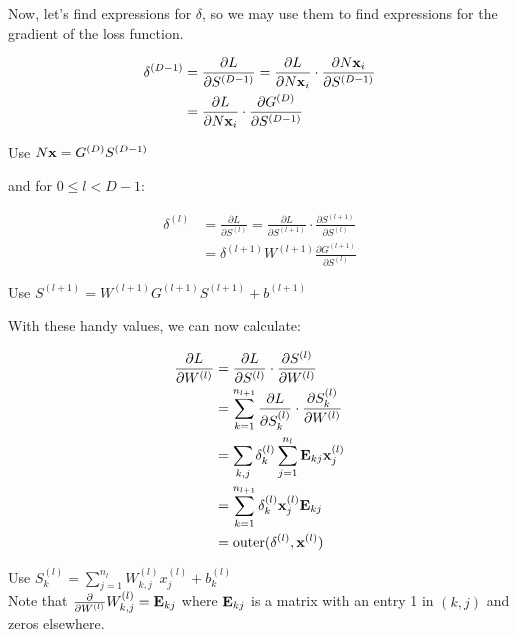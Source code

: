 \medskip
Now, let's find expressions for $\delta$, so we may use them to find expressions for the gradient of the loss function.
\begin{ceqn}
    \begin{align*}
        \delta^{(D-1)}&=\frac{\partial L}{\partial S^{(D-1)}}=\frac{\partial L}{\partial N\vx_{i}}\cdot\frac{\partial N\vx_{i}}{\partial S^{(D-1)}} \\
        &=\frac{\partial L}{\partial N\vx_{i}}\cdot\frac{\partial G^{(D)}}{\partial S^{(D-1)}}
    \end{align*}
\end{ceqn}
\begin{remark}
    Use $N\vx=G^{(D)}S^{(D-1)}$
\end{remark}
\smallskip
and for $0\leq l<D-1$:
\begin{ceqn}
\begin{align*}
    \delta^{(l)}&=\frac{\partial L}{\partial S^{(l)}}=\frac{\partial L}{\partial S^{(l+1)}}\cdot\frac{\partial S^{(l+1)}}{\partial S^{(l)}}\\
&=\delta^{(l+1)}W^{(l+1)}\frac{\partial G^{(l+1)}}{\partial S^{(l)}}
\end{align*}
\end{ceqn}
\begin{remark}
    Use $S^{(l+1)} = W^{(l+1)}G^{(l+1)}S^{(l+1)} + b^{(l+1)}$
\end{remark}
\medskip
With these handy values, we can now calculate:
\begin{ceqn}
\begin{align*}
    \frac{\partial L}{\partial W^{(l)}} &= \frac{\partial L}{\partial S^{(l)}}\cdot\frac{\partial S^{(l)}}{\partial W^{(l)}} \\
    &= \sum_{k=1}^{n_{l+1}}{\frac{\partial L}{\partial S_{k}^{(l)}}\cdot\frac{\partial S_{k}^{(l)}}{\partial W^{(l)}}} \\
    &= \sum_{k,j}{\delta_{k}^{(l)}\sum_{j=1}^{n_{l}}{\ME_{kj}\vx_{j}^{(l)}}} \\
    &= \sum_{k=1}^{n_{l+1}}{\delta_{k}^{(l)}\vx_{j}^{(l)}\ME_{kj}} \\
    &= \mathrm{outer}(\delta^{(l)},\vx^{(l)})
\end{align*}
\end{ceqn}

\begin{remark}
    Use $S_{k}^{(l)}=\sum_{j=1}^{n_l}{W_{k,j}^{(l)}x_j^{(l)}}+b_k^{(l)}$ \\
    Note that $\frac{\partial}{\partial W^{(l)}}W_{k,j}^{(l)}=\ME_{kj}$ where $\ME_{kj}$ is a matrix with an entry 1 in $(k,j)$ and zeros elsewhere.
\end{remark}

